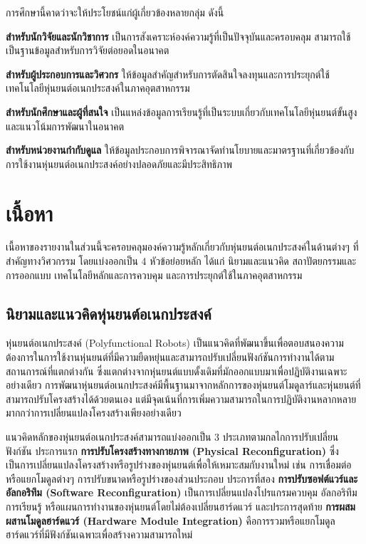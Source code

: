 \documentclass[a4paper]{article}
\begin{document}
การศึกษานี้คาดว่าจะให้ประโยชน์แก่ผู้เกี่ยวข้องหลายกลุ่ม ดังนี้

\textbf{สำหรับนักวิจัยและนักวิชาการ} เป็นการสังเคราะห์องค์ความรู้ที่เป็นปัจจุบันและครอบคลุม สามารถใช้เป็นฐานข้อมูลสำหรับการวิจัยต่อยอดในอนาคต

\textbf{สำหรับผู้ประกอบการและวิศวกร} ให้ข้อมูลสำคัญสำหรับการตัดสินใจลงทุนและการประยุกต์ใช้เทคโนโลยีหุ่นยนต์อเนกประสงค์ในภาคอุตสาหกรรม

\textbf{สำหรับนักศึกษาและผู้ที่สนใจ} เป็นแหล่งข้อมูลการเรียนรู้ที่เป็นระบบเกี่ยวกับเทคโนโลยีหุ่นยนต์ขั้นสูงและแนวโน้มการพัฒนาในอนาคต

\textbf{สำหรับหน่วยงานกำกับดูแล} ให้ข้อมูลประกอบการพิจารณาจัดทำนโยบายและมาตรฐานที่เกี่ยวข้องกับการใช้งานหุ่นยนต์อเนกประสงค์อย่างปลอดภัยและมีประสิทธิภาพ

\section{เนื้อหา}
เนื้อหาของรายงานในส่วนนี้จะครอบคลุมองค์ความรู้หลักเกี่ยวกับหุ่นยนต์อเนกประสงค์ในด้านต่างๆ ที่สำคัญทางวิศวกรรม โดยแบ่งออกเป็น 4 หัวข้อย่อยหลัก ได้แก่ นิยามและแนวคิด สถาปัตยกรรมและการออกแบบ เทคโนโลยีหลักและการควบคุม และการประยุกต์ใช้ในภาคอุตสาหกรรม

\subsection{นิยามและแนวคิดหุ่นยนต์อเนกประสงค์}

หุ่นยนต์อเนกประสงค์ (Polyfunctional Robots) เป็นแนวคิดที่พัฒนาขึ้นเพื่อตอบสนองความต้องการในการใช้งานหุ่นยนต์ที่มีความยืดหยุ่นและสามารถปรับเปลี่ยนฟังก์ชันการทำงานได้ตามสถานการณ์ที่แตกต่างกัน ซึ่งแตกต่างจากหุ่นยนต์แบบดั้งเดิมที่มักออกแบบมาเพื่อปฏิบัติงานเฉพาะอย่างเดียว \parencite{liang2025decoding} การพัฒนาหุ่นยนต์อเนกประสงค์มีพื้นฐานมาจากหลักการของหุ่นยนต์โมดูลาร์และหุ่นยนต์ที่สามารถปรับโครงสร้างได้ด้วยตนเอง แต่มีจุดเน้นที่การเพิ่มความสามารถในการปฏิบัติงานหลากหลายมากกว่าการเปลี่ยนแปลงโครงสร้างเพียงอย่างเดียว

แนวคิดหลักของหุ่นยนต์อเนกประสงค์สามารถแบ่งออกเป็น 3 ประเภทตามกลไกการปรับเปลี่ยนฟังก์ชัน ประการแรก \textbf{การปรับโครงสร้างทางกายภาพ (Physical Reconfiguration)} ซึ่งเป็นการเปลี่ยนแปลงโครงสร้างหรือรูปร่างของหุ่นยนต์เพื่อให้เหมาะสมกับงานใหม่ เช่น การเชื่อมต่อหรือแยกโมดูลต่างๆ การปรับขนาดหรือรูปร่างของส่วนประกอบ \parencite{post2023modular} ประการที่สอง \textbf{การปรับซอฟต์แวร์และอัลกอริทึม (Software Reconfiguration)} เป็นการเปลี่ยนแปลงโปรแกรมควบคุม อัลกอริทึมการเรียนรู้ หรือแผนการทำงานของหุ่นยนต์โดยไม่ต้องเปลี่ยนฮาร์ดแวร์ และประการสุดท้าย \textbf{การผสมผสานโมดูลฮาร์ดแวร์ (Hardware Module Integration)} คือการรวมหรือแยกโมดูลฮาร์ดแวร์ที่มีฟังก์ชันเฉพาะเพื่อสร้างความสามารถใหม่
\end{document}
